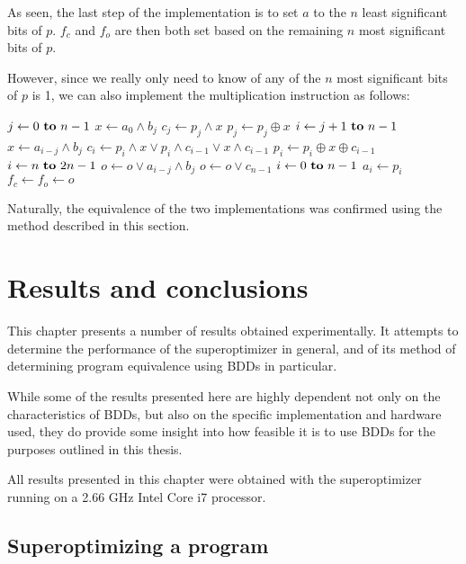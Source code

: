 \documentclass[a4paper,11pt]{kth-mag}
\renewcommand{\gets}{\leftarrow}
\newcommand{\AND}{\land}
\newcommand{\IOR}{\lor}
\newcommand{\XOR}{\oplus}
\begin{document}
As seen, the last step of the implementation is to set $a$ to the $n$ least significant bits of $p$.
$f_c$ and $f_o$ are then both set based on the remaining $n$ most significant bits of $p$.

However, since we really only need to know of any of the $n$ most significant bits of $p$ is 1, we can also implement the multiplication instruction as follows:

\begin{codebox}
\zi \For $j \gets 0 \To n-1$ \Do
\zi   $x \gets a_{0} \AND b_{j}$
\zi   $c_{j} \gets p_{j} \AND x$
\zi   $p_{j} \gets p_{j} \XOR x$
\zi   \For $i \gets j+1 \To n-1$ \Do
\zi     $x \gets a_{i-j} \AND b_{j}$
\zi     $c_{i} \gets p_{i} \AND x \IOR p_{i} \AND c_{i-1} \IOR x \AND c_{i-1}$
\zi     $p_{i} \gets p_{i} \XOR x \XOR c_{i-1}$ \End
\zi   \For $i \gets n \To 2n-1$ \Do
\zi     $o \gets o \IOR a_{i-j} \AND b_{j}$ \End
\zi   $o \gets o \IOR c_{n-1}$ \End
\zi \For $i \gets 0 \To n-1$ \Do
\zi   $a_{i} \gets p_{i}$ \End
\zi $f_c \gets f_o \gets o$
\end{codebox}

Naturally, the equivalence of the two implementations was confirmed using the method described in this section.

\chapter{Results and conclusions}
\label{ch:results_conclusions}

This chapter presents a number of results obtained experimentally.
It attempts to determine the performance of the superoptimizer in general, and of its method of determining program equivalence using BDDs in particular.

While some of the results presented here are highly dependent not only on the characteristics of BDDs, but also on the specific implementation and hardware used,
they do provide some insight into how feasible it is to use BDDs for the purposes outlined in this thesis.

All results presented in this chapter were obtained with the superoptimizer running on a 2.66 GHz Intel Core i7 processor.

\section{Superoptimizing a program}
\label{s:superoptimizing_a_program}

\end{document}

